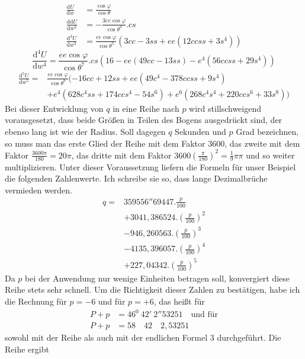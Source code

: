 \[
\begin{aligned}
\frac{\mathrm{d}U}{\mathrm{d}w}&=\frac{\cos\varphi}{\cos\theta}\\
\frac{\mathrm{dd}U}{\mathrm{d}w^2}&=-\frac{3ee\cos\varphi}{\cos\theta^3}\mathord{.}cs\\
\frac{\mathrm{d}^3U}{\mathrm{d}w^3}&=\frac{ee\cos\varphi}{\cos\theta^5}(3cc-3ss+ee(12ccss+3s^4))
\end{aligned}
\]
\[
\frac{\mathrm{d}^4U}{\mathrm{d}w^4}=\frac{ee\cos\varphi}{\cos\theta^7}\mathord{.}cs(16-ee(49cc-13ss)-e^4(56ccss+29s^4))
\]
\[
\begin{aligned}
\frac{\mathrm{d}^5U}{\mathrm{d}w^5}={}&\frac{ee\cos\varphi}{\cos\theta^9}(-16cc+12ss+ee(49c^4-378ccss+9s^4)\\
&+e^4(628c^4ss+174ccs^4-54s^6)+e^6(268c^4s^4+220ccs^6+33s^8))
\end{aligned}
\]
\indent Bei dieser Entwicklung von \(q\) in eine Reihe nach \(p\) wird stillschweigend vorausgesetzt, dass beide Größen in Teilen des Bogens ausgedrückt sind, der ebenso lang ist wie der Radius. Soll dagegen \(q\) Sekunden und \(p\) Grad bezeichnen, so muss man das erste Glied der Reihe mit dem Faktor \(3600\), das zweite mit dem Faktor \(\tfrac{3600\pi}{180}=20\pi\), das dritte mit dem Faktor \(3600(\tfrac{\pi}{180})^2=\tfrac{1}{9}\pi\pi\) und so weiter multiplizieren. Unter dieser Voraussetzung liefern die Formeln für unser Beispiel die folgenden Zahlenwerte. Ich schreibe sie so, dass lange Dezimalbrüche vermieden werden.
\[
\begin{aligned}
q={}&359556''69447\mathord{.}\frac{p}{100}\\
&+3041{,}386524\mathord{.}(\frac{p}{100})^2\\
&-946{,}260563\mathord{.}(\frac{p}{100})^3\\
&-4135{,}396057\mathord{.}(\frac{p}{100})^4\\
&+227{,}04342\mathord{.}(\frac{p}{100})^5
\end{aligned}
\]
Da \(p\) bei der Anwendung nur wenige Einheiten betragen soll, konvergiert diese Reihe stets sehr schnell. Um die Richtigkeit dieser Zahlen zu bestätigen, habe ich die Rechnung für \(p=-6\) und für \(p=+6\), das heißt für
\[
\begin{aligned}
P+p&=46^0\ 42'\ 2''53251\quad\text{und für}\\
P+p&=58\quad42\quad2{,}53251
\end{aligned}
\]
sowohl mit der Reihe als auch mit der endlichen Formel 3 durchgeführt. Die Reihe ergibt
